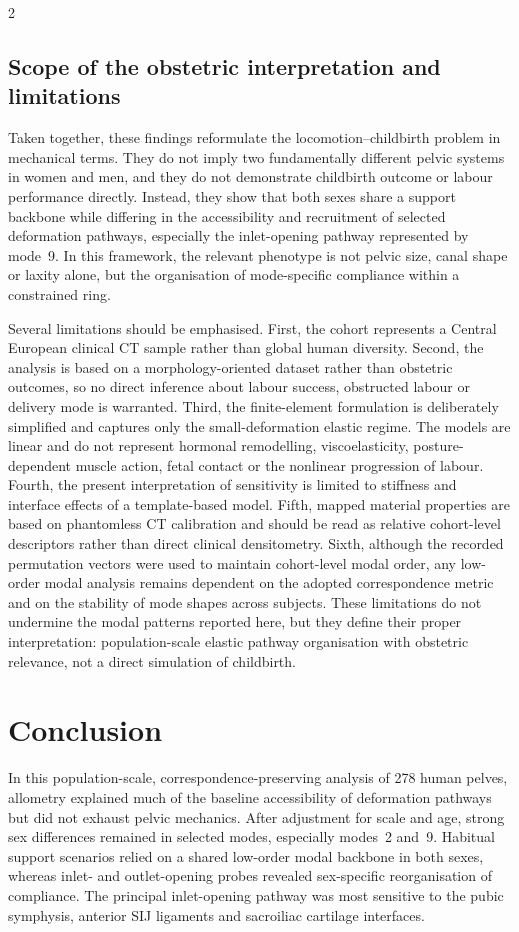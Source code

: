 \documentclass[openacc]{rsproca_new}
\begin{document}
\begin{multicols}{2}
\subsection{Scope of the obstetric interpretation and limitations}

Taken together, these findings reformulate the locomotion--childbirth problem in mechanical terms. They do not imply two fundamentally different pelvic systems in women and men, and they do not demonstrate childbirth outcome or labour performance directly. Instead, they show that both sexes share a support backbone while differing in the accessibility and recruitment of selected deformation pathways, especially the inlet-opening pathway represented by mode~9. In this framework, the relevant phenotype is not pelvic size, canal shape or laxity alone, but the organisation of mode-specific compliance within a constrained ring.

Several limitations should be emphasised. First, the cohort represents a Central European clinical CT sample rather than global human diversity. Second, the analysis is based on a morphology-oriented dataset rather than obstetric outcomes, so no direct inference about labour success, obstructed labour or delivery mode is warranted. Third, the finite-element formulation is deliberately simplified and captures only the small-deformation elastic regime. The models are linear and do not represent hormonal remodelling, viscoelasticity, posture-dependent muscle action, fetal contact or the nonlinear progression of labour. Fourth, the present interpretation of sensitivity is limited to stiffness and interface effects of a template-based model. Fifth, mapped material properties are based on phantomless CT calibration and should be read as relative cohort-level descriptors rather than direct clinical densitometry. Sixth, although the recorded permutation vectors were used to maintain cohort-level modal order, any low-order modal analysis remains dependent on the adopted correspondence metric and on the stability of mode shapes across subjects. These limitations do not undermine the modal patterns reported here, but they define their proper interpretation: population-scale elastic pathway organisation with obstetric relevance, not a direct simulation of childbirth.

\section{Conclusion}

In this population-scale, correspondence-preserving analysis of 278 human pelves, allometry explained much of the baseline accessibility of deformation pathways but did not exhaust pelvic mechanics. After adjustment for scale and age, strong sex differences remained in selected modes, especially modes~2 and~9. Habitual support scenarios relied on a shared low-order modal backbone in both sexes, whereas inlet- and outlet-opening probes revealed sex-specific reorganisation of compliance. The principal inlet-opening pathway was most sensitive to the pubic symphysis, anterior SIJ ligaments and sacroiliac cartilage interfaces.


\end{multicols}
\end{document}
